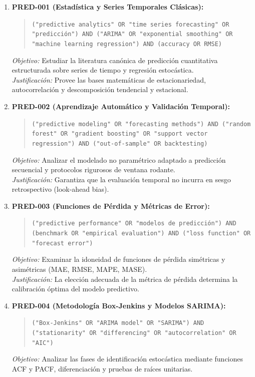 \begin{enumerate}
  \item \textbf{PRED-001 (Estadística y Series Temporales Clásicas):}
  \begin{quote}
  \texttt{("predictive analytics" OR "time series forecasting" OR "predicción") AND ("ARIMA" OR "exponential smoothing" OR "machine learning regression") AND (accuracy OR RMSE)}
  \end{quote}
  \textit{Objetivo:} Estudiar la literatura canónica de predicción cuantitativa estructurada sobre series de tiempo y regresión estocástica.\\
  \textit{Justificación:} Provee las bases matemáticas de estacionariedad, autocorrelación y descomposición tendencial y estacional.
  \item \textbf{PRED-002 (Aprendizaje Automático y Validación Temporal):}
  \begin{quote}
  \texttt{("predictive modeling" OR "forecasting methods") AND ("random forest" OR "gradient boosting" OR "support vector regression") AND ("out-of-sample" OR backtesting)}
  \end{quote}
  \textit{Objetivo:} Analizar el modelado no paramétrico adaptado a predicción secuencial y protocolos rigurosos de ventana rodante.\\
  \textit{Justificación:} Garantiza que la evaluación temporal no incurra en sesgo retrospectivo (look-ahead bias).
  \item \textbf{PRED-003 (Funciones de Pérdida y Métricas de Error):}
  \begin{quote}
  \texttt{("predictive performance" OR "modelos de predicción") AND (benchmark OR "empirical evaluation") AND ("loss function" OR "forecast error")}
  \end{quote}
  \textit{Objetivo:} Examinar la idoneidad de funciones de pérdida simétricas y asimétricas (MAE, RMSE, MAPE, MASE).\\
  \textit{Justificación:} La elección adecuada de la métrica de pérdida determina la calibración óptima del modelo predictivo.
  \item \textbf{PRED-004 (Metodología Box-Jenkins y Modelos SARIMA):}
  \begin{quote}
  \texttt{("Box-Jenkins" OR "ARIMA model" OR "SARIMA") AND ("stationarity" OR "differencing" OR "autocorrelation" OR "AIC")}
  \end{quote}
  \textit{Objetivo:} Analizar las fases de identificación estocástica mediante funciones ACF y PACF, diferenciación y pruebas de raíces unitarias.\\

\end{enumerate}
